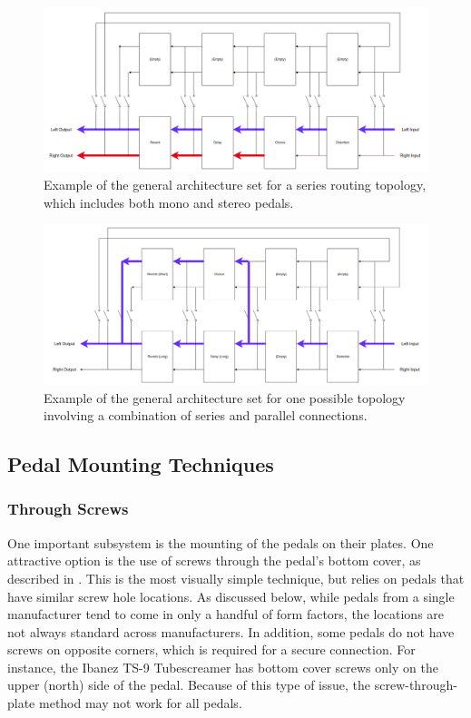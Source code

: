 \documentclass{article}
\begin{document}
	\begin{figure}
		\centering
		\includegraphics[width = \textwidth]{StereoSeriesRouting.png}
		\caption{Example of the general architecture set for a series routing topology, which includes both mono and stereo pedals.}
		\label{fig:Series}
	\end{figure}

	\begin{figure}
		\centering
		\includegraphics[width = \textwidth]{MonoParallelRouting.png}
		\caption{Example of the general architecture set for one possible topology involving a combination of series and parallel connections.}
		\label{fig:Parallel}
	\end{figure}

	\subsection{Pedal Mounting Techniques}
		\subsubsection{Through Screws}
		One important subsystem is the mounting of the pedals on their plates.  One attractive option is the use of screws through the pedal's bottom cover, as described in \cite{ABBATE:2016}.  This is the most visually simple technique, but relies on pedals that have similar screw hole locations.  As discussed below, while pedals from a single manufacturer tend to come in only a handful of form factors, the locations are not always standard across manufacturers.  In addition, some pedals do not have screws on opposite corners, which is required for a secure connection.  For instance, the Ibanez TS-9 Tubescreamer has bottom cover screws only on the upper (north) side of the pedal.  Because of this type of issue, the screw-through-plate method may not work for all pedals.
\end{document}
